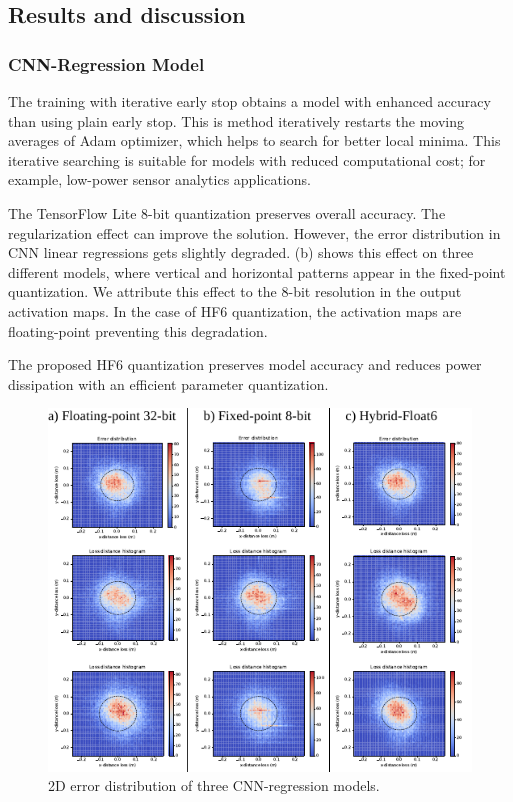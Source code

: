 \subsection{Results and discussion}
\subsubsection{CNN-Regression Model}
The training with iterative early stop obtains a model with enhanced accuracy than using plain early stop. This is method iteratively restarts the moving averages of Adam optimizer, which helps to search for better local minima. This iterative searching is suitable for models with reduced computational cost; for example, low-power sensor analytics applications.

The TensorFlow Lite 8-bit quantization preserves overall accuracy. The regularization effect can improve the solution. However, the error distribution in CNN linear regressions gets slightly degraded. (b) shows this effect on three different models, where vertical and horizontal patterns appear in the fixed-point quantization. We attribute this effect to the 8-bit resolution in the output activation maps. In the case of HF6 quantization, the activation maps are floating-point preventing this degradation.

The proposed HF6 quantization preserves model accuracy and reduces power dissipation with an efficient parameter quantization.

\begin{figure}[t!]
	\centering
	\includegraphics[width=1\columnwidth]{../figures/histograms/2D_error_distribtion.pdf}
	\caption{2D error distribution of three CNN-regression models.}
	\label{fig:2d_error_distribtion}
\end{figure}

